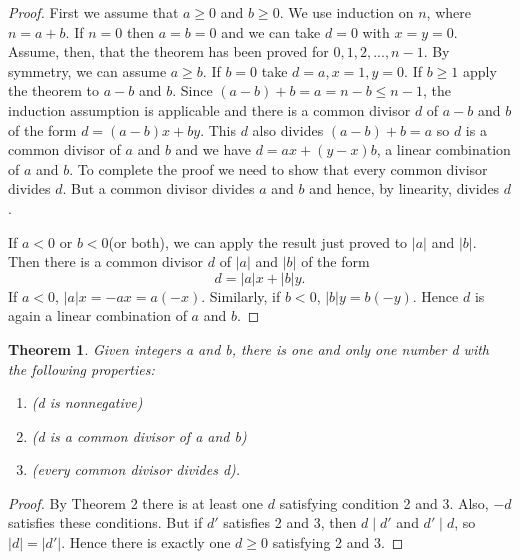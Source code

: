 \documentclass[11pt]{article}
\newtheorem{theorem}{Theorem}
\begin{document}
\begin{proof}
  First we assume that \(a \geq 0\) and \(b \geq 0\). We use induction on \(n\), where
  \(n = a + b\). If \(n = 0\) then \(a = b = 0\) and we can take \(d = 0\) with \(x
  = y = 0\). Assume, then, that the theorem has been proved for \(0,1,2,...,n-1\).
  By symmetry, we can assume \(a \geq b\). If \(b = 0\) take \(d = a, x = 1, y = 0\).
  If \(b \geq 1\) apply the theorem to \(a - b\) and \(b\). Since \((a - b) + b =
  a = n - b \leq n - 1\), the induction assumption is applicable and there is a common
  divisor \(d\) of \(a - b\) and \(b\) of the form \(d = (a-b)x + by\). This \(d\)
  also divides \((a - b) + b = a\) so \(d\) is a common divisor of \(a\) and \(b\)
  and we have \(d = ax + (y - x)b\), a linear combination of \(a\) and \(b\). To
  complete the proof we need to show that every common divisor divides \(d\). But
  a common divisor divides \(a\) and \(b\) and hence, by linearity, divides \(d\).

  If \(a < 0\) or \(b < 0\)(or both), we can apply the result just proved to
  \(| a |\) and \(| b |\). Then there is a common divisor \(d\) of
  \(| a |\) and \(| b |\) of the form
  \[
  d = | a | x + | b | y.
  \]
  If \(a < 0\), \(| a | x = -ax = a(-x)\). Similarly, if \(b < 0\), \(|
  b | y = b(-y)\). Hence \(d\) is again a linear combination of \(a\) and \(b\).
\end{proof}

\begin{theorem}
  Given integers a and b, there is one and only one number d with the following properties:
  \begin{enumerate}
  \item {} (d is nonnegative)
  \item {} (d is a common divisor of a and b)
  \item {} (every common divisor divides d).
  \end{enumerate}
\end{theorem}

\begin{proof}
  By Theorem 2 there is at least one \(d\) satisfying condition 2 and 3. Also,
  \(-d\) satisfies these conditions. But if \(d'\) satisfies 2 and 3, then
  \(d \mid d'\) and \(d' \mid d\), so \(| d | = | d' |\). Hence
  there is exactly one \(d \geq 0\) satisfying 2 and 3.
\end{proof}
\end{document}
